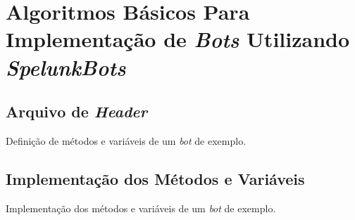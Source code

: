\chapter{\label{appendix:spelunkbots-algorithms}Algoritmos Básicos Para
Implementação de \textit{Bots} Utilizando \textit{SpelunkBots}}

\section{Arquivo de \textit{Header}}

\begin{algorithm}[H]

\caption[Definição de métodos e variáveis de um \textit{bot} de exemplo.]
{\label{alg:project-example-bot-header}Definição de métodos e variáveis de um
\textit{bot} de exemplo.}
\end{algorithm}

\section{Implementação dos Métodos e Variáveis}

\begin{algorithm}[H]

\caption[Implementação dos métodos e variáveis de um \textit{bot} de exemplo.]
{\label{alg:project-example-bot-impl}Implementação dos métodos e variáveis de um
\textit{bot} de exemplo.}
\end{algorithm}
